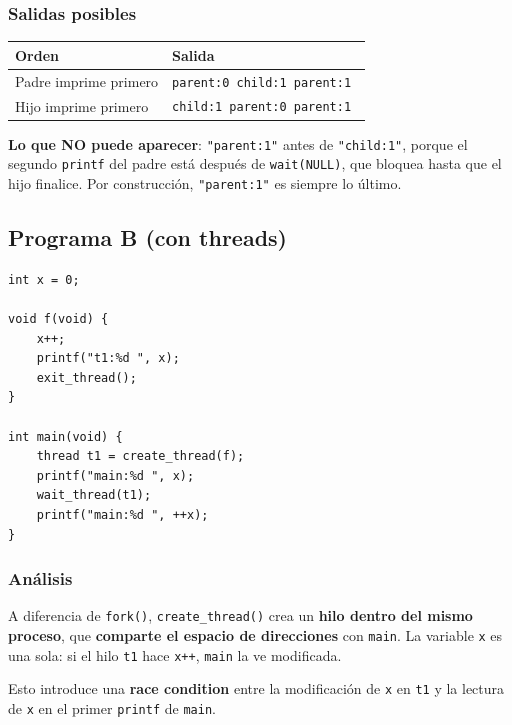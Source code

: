 \documentclass[11pt,a4paper]{article}
\begin{document}
\subsubsection*{Salidas posibles}

\begin{center}
\small
\begin{tabular}{@{}lp{8cm}@{}}
\toprule
Orden & Salida \\
\midrule
Padre imprime primero & \texttt{parent:0 child:1 parent:1\ } \\
Hijo imprime primero  & \texttt{child:1 parent:0 parent:1\ } \\
\bottomrule
\end{tabular}
\end{center}

\begin{idea}
\textbf{Lo que NO puede aparecer}: \texttt{"parent:1"} antes de
\texttt{"child:1"}, porque el segundo \texttt{printf} del padre está
después de \texttt{wait(NULL)}, que bloquea hasta que el hijo
finalice. Por construcción, \texttt{"parent:1"} es siempre lo último.
\end{idea}

\subsection*{Programa B (con threads)}

\begin{lstlisting}[style=cstyle]
int x = 0;

void f(void) {
    x++;
    printf("t1:%d ", x);
    exit_thread();
}

int main(void) {
    thread t1 = create_thread(f);
    printf("main:%d ", x);
    wait_thread(t1);
    printf("main:%d ", ++x);
}
\end{lstlisting}

\subsubsection*{Análisis}

A diferencia de \texttt{fork()}, \texttt{create\_thread()} crea un
\textbf{hilo dentro del mismo proceso}, que \textbf{comparte el
espacio de direcciones} con \texttt{main}. La variable \texttt{x} es
una sola: si el hilo \texttt{t1} hace \texttt{x++}, \texttt{main} la
ve modificada.

Esto introduce una \textbf{race condition} entre la modificación de
\texttt{x} en \texttt{t1} y la lectura de \texttt{x} en el primer
\texttt{printf} de \texttt{main}.
\end{document}
